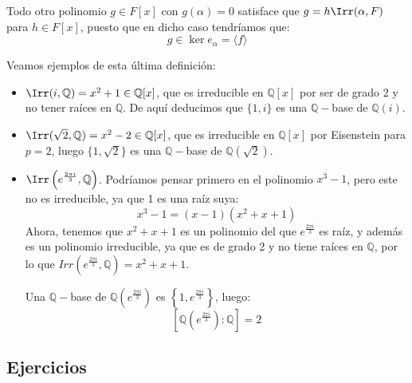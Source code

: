 \begin{observacion}
    Todo otro polinomio $g\in F[x]$ con $g(\alpha)=0$ satisface que $g = h\Irr(\alpha,F)$ para $h\in F[x]$, puesto que en dicho caso tendríamos que:
    \begin{equation*}
        g \in \ker e_\alpha = \langle f \rangle 
    \end{equation*}
\end{observacion}

\begin{ejemplo}
    Veamos ejemplos de esta última definición:
    \begin{itemize}
        \item $\Irr(i,\mathbb{Q}) = x^2+1 \in \mathbb{Q}[x]$, que es irreducible en $\mathbb{Q}[x]$  por ser de grado 2 y no tener raíces en $\mathbb{Q}$. De aquí deducimos que $\{1,i\}$ es una $\mathbb{Q}-$base de $\mathbb{Q}(i)$.
        \item $\Irr(\sqrt{2}, \mathbb{Q}) = x^2-2 \in \mathbb{Q}[x]$, que es irreducible en $\mathbb{Q}[x]$ por Eisenstein para $p=2$, luego $\{1,\sqrt{2}\}$ es una $\mathbb{Q}-$base de $\mathbb{Q}(\sqrt{2})$.
        \item $\Irr\left(e^{\frac{2\pi i}{3}}, \mathbb{Q}\right)$. Podríamos pensar primero en el polinomio $x^3-1$, pero este no es irreducible, ya que 1 es una raíz suya:
            \begin{equation*}
                x^3-1 = (x-1)\left(x^2+x+1\right)
            \end{equation*}
            Ahora, tenemos que $x^2+x+1$ es un polinomio del que $e^{\frac{2\pi i}{3}}$ es raíz, y además es un polinomio irreducible, ya que es de grado 2 y no tiene raíces en $\mathbb{Q}$, por lo que $Irr\left(e^{\frac{2\pi i}{3}}, \mathbb{Q}\right) = x^2+x+1$.

            Una $\mathbb{Q}-$base de $\mathbb{Q}\left(e^{\frac{2\pi i}{3}}\right)$ es $\left\{1,e^{\frac{2\pi i}{3}}\right\}$, luego:
            \begin{equation*}
                \left[\mathbb{Q}\left(e^{\frac{2\pi i}{3}}\right):\mathbb{Q}\right] = 2
            \end{equation*}
    \end{itemize}
\end{ejemplo}

\subsection{Ejercicios}


